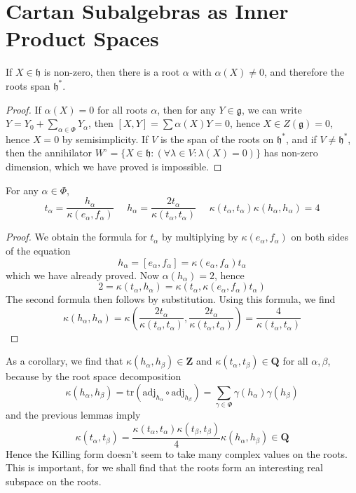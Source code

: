 \section{Cartan Subalgebras as Inner Product Spaces}

\begin{lemma}
    If $X \in \mathfrak{h}$ is non-zero, then there is a root $\alpha$ with $\alpha(X) \neq 0$, and therefore the roots span $\mathfrak{h}^*$.
\end{lemma}
\begin{proof}
    If $\alpha(X) = 0$ for all roots $\alpha$, then for any $Y \in \mathfrak{g}$, we can write $Y = Y_0 + \sum_{\alpha \in \Phi} Y_\alpha$, then $[X,Y] = \sum \alpha(X) Y = 0$, hence $X \in Z(\mathfrak{g}) = 0$, hence $X = 0$ by semisimplicity. If $V$ is the span of the roots on $\mathfrak{h}^*$, and if $V \neq \mathfrak{h}^*$, then the annihilator $W^\circ = \{ X \in \mathfrak{h} : (\forall \lambda \in V: \lambda(X) = 0) \}$ has non-zero dimension, which we have proved is impossible.
\end{proof}

\begin{lemma}
    For any $\alpha \in \Phi$,
    \[ t_\alpha = \frac{h_\alpha}{\kappa(e_\alpha, f_\alpha)}\ \ \ \ \ \ h_\alpha = \frac{2t_\alpha}{\kappa(t_\alpha, t_\alpha)}\ \ \ \ \ \ \kappa(t_\alpha, t_\alpha) \kappa(h_\alpha, h_\alpha) = 4 \]
\end{lemma}
\begin{proof}
    We obtain the formula for $t_\alpha$ by multiplying by $\kappa(e_\alpha, f_\alpha)$ on both sides of the equation
    \[ h_\alpha = [e_\alpha, f_\alpha] = \kappa(e_\alpha, f_\alpha) t_\alpha \]
    which we have already proved. Now $\alpha(h_\alpha) = 2$, hence
    \[ 2 = \kappa(t_\alpha,h_\alpha) = \kappa(t_\alpha, \kappa(e_\alpha,f_\alpha)t_\alpha) \]
    The second formula then follows by substitution. Using this formula, we find
    \[ \kappa (h_\alpha, h_\alpha) = \kappa \left( \frac{2t_\alpha}{\kappa(t_\alpha,t_\alpha)}, \frac{2t_\alpha}{\kappa(t_\alpha,t_\alpha)} \right) = \frac{4}{\kappa(t_\alpha, t_\alpha)} \]
\end{proof}

As a corollary, we find that $\kappa(h_\alpha, h_\beta) \in \mathbf{Z}$ and $\kappa(t_\alpha, t_\beta) \in \mathbf{Q}$ for all $\alpha, \beta$, because by the root space decomposition
%
\[ \kappa(h_\alpha, h_\beta) = \text{tr}(\text{adj}_{h_\alpha} \circ \text{adj}_{h_\beta}) = \sum_{\gamma \in \Phi} \gamma(h_\alpha) \gamma(h_\beta) \]
%
and the previous lemmas imply
%
\[ \kappa(t_\alpha, t_\beta) = \frac{\kappa(t_\alpha, t_\alpha) \kappa(t_\beta, t_\beta)}{4} \kappa(h_\alpha, h_\beta) \in \mathbf{Q} \]
%
Hence the Killing form doesn't seem to take many complex values on the roots. This is important, for we shall find that the roots form an interesting real subspace on the roots.

